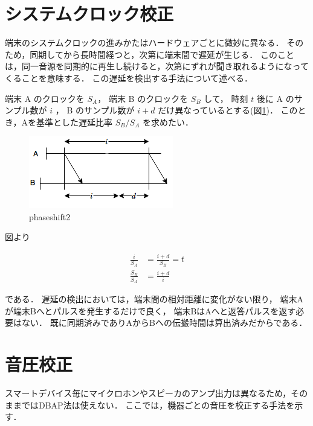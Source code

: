 
\section{システムクロック校正}

端末のシステムクロックの進みかたはハードウェアごとに微妙に異なる．
そのため，同期してから長時間経つと，次第に端末間で遅延が生じる．
このことは，同一音源を同期的に再生し続けると，次第にずれが聞き取れるようになってくることを意味する．
この遅延を検出する手法について述べる．

端末 A のクロックを $S_A$，
端末 B のクロックを $S_B$ して，
時刻 $t$ 後に
A のサンプル数が $i$ ，
B のサンプル数が $i+d$ だけ異なっているとする(図\ref{fig:phaseshift2})．
このとき，Aを基準とした遅延比率 $S_B/S_A$ を求めたい．

\begin{figure}[tb]\centering
  \hspace{-2mm}\includegraphics[clip,width=1.1\hsize]{img/phase_shift2.png}
  \caption{phaseshift2}\label{fig:phaseshift2}
\end{figure}

図より

$$\begin{aligned}
\frac{i}{S_A} &= \frac{i+d}{S_B} = t \\
\frac{S_B}{S_A} &= \frac{i+d}{i}
\end{aligned}$$

である．
遅延の検出においては，端末間の相対距離に変化がない限り，
端末Aが端末Bへとパルスを発生するだけで良く，
端末BはAへと返答パルスを返す必要はない．
既に同期済みでありAからBへの伝搬時間は算出済みだからである．



\section{音圧校正}
スマートデバイス毎にマイクロホンやスピーカのアンプ出力は異なるため，そのままではDBAP法は使えない．
ここでは，機器ごとの音圧を校正する手法を示す．

